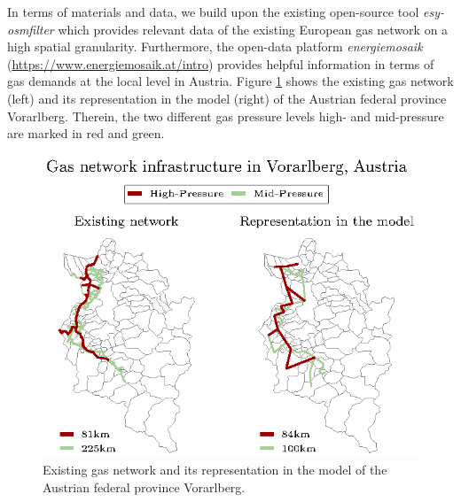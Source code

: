 \documentclass[review]{elsarticle}
\begin{document}
In terms of materials and data, we build upon the existing open-source tool \textit{esy-osmfilter} \cite{pluta2020esy} which provides relevant data of the existing European gas network on a high spatial granularity. Furthermore, the open-data platform \textit{energiemosaik} (\url{https://www.energiemosaik.at/intro}) provides helpful information in terms of gas demands at the local level in Austria. Figure \ref{fig:network_west} shows the existing gas network (left) and its representation in the model (right) of the Austrian federal province Vorarlberg. Therein, the two different gas pressure levels high- and mid-pressure are marked in red and green.

\begin{figure}[h]
	\centering
	\includegraphics[width=0.95\linewidth]{Network_T8.eps}
	\caption{Existing gas network and its representation in the model of the Austrian federal province Vorarlberg.}
	\label{fig:network_west}
\end{figure}
\end{document}

